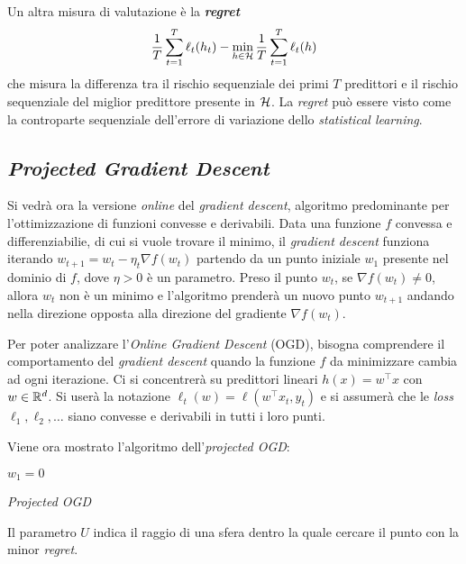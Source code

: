 Un altra misura di valutazione è la \textbf{\textit{regret}}
$$
\frac{1}{T}\sum_{t=1}^{T}\ell_t(h_t)-
\min_{h\in\mathcal{H}}\frac{1}{T}\sum_{t=1}^{T}\ell_t(h)
$$
che misura la differenza tra il rischio sequenziale dei primi $T$ predittori
e il rischio sequenziale del miglior predittore presente in $\mathcal{H}$. La
\textit{regret} può essere visto come la controparte sequenziale dell'errore
di variazione dello \textit{statistical learning}.

\subsection{\textit{Projected Gradient Descent}}
Si vedrà ora la versione \textit{online} del \textit{gradient descent},
algoritmo predominante per l'ottimizzazione di funzioni convesse e derivabili.
Data una funzione $f$ convessa e differenziabilie, di cui si vuole trovare il 
minimo, il \textit{gradient descent} funziona iterando 
$w_{t+1}=w_t-\eta_t\nabla f(w_t)$ partendo da un punto iniziale $w_1$ presente
nel dominio di $f$, dove $\eta>0$ è un parametro. Preso il punto $w_t$, se
$\nabla f(w_t)\neq 0$, allora $w_t$ non è un minimo e l'algoritmo prenderà
un nuovo punto $w_{t+1}$ andando nella direzione opposta alla direzione del
gradiente $\nabla f(w_t)$.

Per poter analizzare l'\textit{Online Gradient Descent} (OGD), bisogna
comprendere il comportamento del \textit{gradient descent} quando la funzione
$f$ da minimizzare cambia ad ogni iterazione. Ci si concentrerà su predittori
lineari $h(x)=w^\top x$ con $w\in\mathbb{R}^d$. Si userà la notazione
$\ell_t(w) = \ell(w^\top x_t,y_t)$ e si assumerà che le \textit{loss}
$\ell_1,\ell_2,\dots$ siano convesse e derivabili in tutti i loro punti.

Viene ora mostrato l'algoritmo dell'\textit{projected OGD}:

\begin{algorithm}[H]
    \DontPrintSemicolon
    \;
    $w_1 = 0\qquad$ \;
    \caption{\textit{Projected OGD}}
\end{algorithm}
Il parametro $U$ indica il raggio di una sfera dentro la quale cercare il
punto con la minor \textit{regret}.

